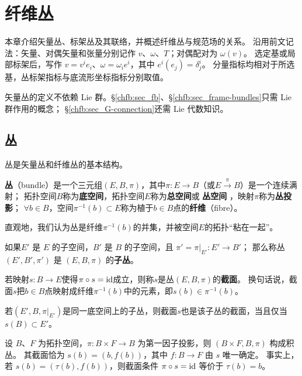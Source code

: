 \chapter{纤维丛}

本章介绍矢量丛、标架丛及其联络，并概述纤维丛与规范场的关系。
沿用前文记法：矢量、对偶矢量和张量分别记作 $v$、$\omega$、$T$；对偶配对为 $\omega(v)$。
选定基或局部标架后，写作 $v=v^i e_i$、$\omega=\omega_i e^i$，其中 $e^i(e_j)=\delta^i_j$。
分量指标均相对于所选基，丛标架指标与底流形坐标指标分别取值。

矢量丛的定义不依赖 Lie 群。\S\ref{chfb:sec_fb}、\S\ref{chfb:sec_frame-bundles}只需 Lie 群作用的概念；
\S\ref{chfb:sec_G-connection}还需 Lie 代数知识。

\section{丛}
丛是矢量丛和纤维丛的基本结构。

\begin{definition}
    \textbf{丛}（bundle）是一个三元组$(E, B, \pi)$，其中$\pi: E\to B$（或$E\xrightarrow{\pi} B$）是一个连续满射；
    拓扑空间$B$称为\textbf{底空间}，拓扑空间$E$称为\textbf{总空间}或 \textbf{丛空间} ，映射$\pi$称为\textbf{丛投影}；
    $\forall b\in B$，空间$\pi^{-1}(b)\subset E$称为植于$ b\in B$点的\textbf{纤维}（fibre）。
\end{definition}
直观地，我们认为丛是纤维$\pi^{-1}(b)$的并集，并被空间$E$的拓扑“粘在一起”。

\begin{definition}
     如果$E'$ 是 $E$ 的子空间，$B'$ 是 $B$ 的子空间，且 $ \pi' = \pi |_{E'}: E'\to B'$；
     那么称丛 $(E',  B',\pi')$ 是 $(E, B,\pi)$ 的\textbf{子丛}。
\end{definition}

\begin{definition}
    若映射$s: B\to E$使得$\pi \circ s = \mathrm{id} $成立，则称$s$是丛$(E, B,\pi)$的\textbf{截面}。
    换句话说，截面$s$把$b\in B$点映射成纤维$\pi^{-1}(b)$中的元素，即$s(b)\in \pi^{-1}(b)$。
\end{definition}

若$(E',B,\pi|_{E'})$是同一底空间上的子丛，则截面$s$也是该子丛的截面，当且仅当$s(B)\subset E'$。

设 $B$、$F$ 为拓扑空间，$\pi:B\times F\to B$ 为第一因子投影，则 $(B\times F,B,\pi)$ 构成积丛。
其截面恰为 $s(b)=(b,f(b))$，其中 $f:B\to F$ 由 $s$ 唯一确定。
事实上，若 $s(b)=(\tau(b),f(b))$，则截面条件 $\pi\circ s=\mathrm{id}$ 等价于 $\tau(b)=b$。

